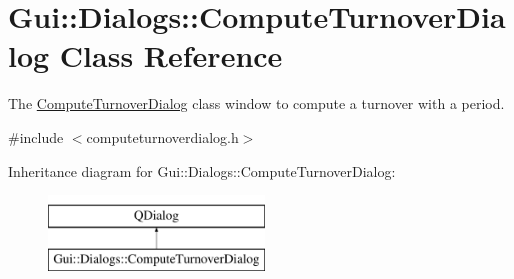 \hypertarget{classGui_1_1Dialogs_1_1ComputeTurnoverDialog}{}\section{Gui\+:\+:Dialogs\+:\+:Compute\+Turnover\+Dialog Class Reference}
\label{classGui_1_1Dialogs_1_1ComputeTurnoverDialog}


The \hyperlink{classGui_1_1Dialogs_1_1ComputeTurnoverDialog}{Compute\+Turnover\+Dialog} class window to compute a turnover with a period.  




{\ttfamily \#include $<$computeturnoverdialog.\+h$>$}

Inheritance diagram for Gui\+:\+:Dialogs\+:\+:Compute\+Turnover\+Dialog\+:\begin{figure}[H]
\begin{center}
\leavevmode
\includegraphics[height=2.000000cm]{d1/d0e/classGui_1_1Dialogs_1_1ComputeTurnoverDialog}
\end{center}
\end{figure}
